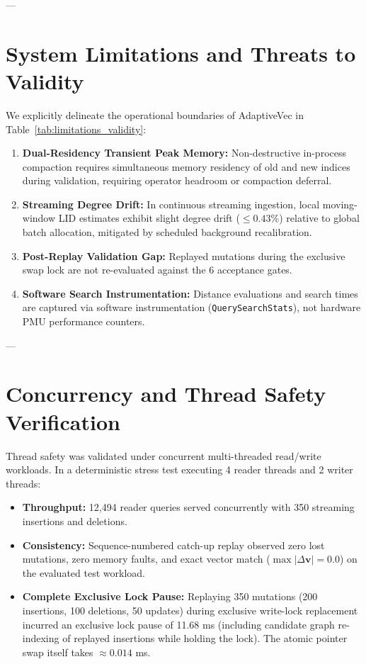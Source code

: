 \documentclass[10pt,journal,compsoc]{IEEEtran}
\begin{document}
---

\section{System Limitations and Threats to Validity}
\label{sec:limitations}



We explicitly delineate the operational boundaries of AdaptiveVec in Table~\ref{tab:limitations_validity}:
\begin{enumerate}
    \item \textbf{Dual-Residency Transient Peak Memory:} Non-destructive in-process compaction requires simultaneous memory residency of old and new indices during validation, requiring operator headroom or compaction deferral.
    \item \textbf{Streaming Degree Drift:} In continuous streaming ingestion, local moving-window LID estimates exhibit slight degree drift ($\le 0.43\%$) relative to global batch allocation, mitigated by scheduled background recalibration.
    \item \textbf{Post-Replay Validation Gap:} Replayed mutations during the exclusive swap lock are not re-evaluated against the 6 acceptance gates.
    \item \textbf{Software Search Instrumentation:} Distance evaluations and search times are captured via software instrumentation (\texttt{QuerySearchStats}), not hardware PMU performance counters.
\end{enumerate}

---

\section{Concurrency and Thread Safety Verification}
\label{sec:concurrency}

Thread safety was validated under concurrent multi-threaded read/write workloads. In a deterministic stress test executing 4 reader threads and 2 writer threads:
\begin{itemize}
    \item \textbf{Throughput:} 12,494 reader queries served concurrently with 350 streaming insertions and deletions.
    \item \textbf{Consistency:} Sequence-numbered catch-up replay observed zero lost mutations, zero memory faults, and exact vector match ($\max |\Delta \mathbf{v}| = 0.0$) on the evaluated test workload.
    \item \textbf{Complete Exclusive Lock Pause:} Replaying 350 mutations (200 insertions, 100 deletions, 50 updates) during exclusive write-lock replacement incurred an exclusive lock pause of 11.68 ms (including candidate graph re-indexing of replayed insertions while holding the lock). The atomic pointer swap itself takes $\approx 0.014$ ms.
\end{itemize}
\end{document}
